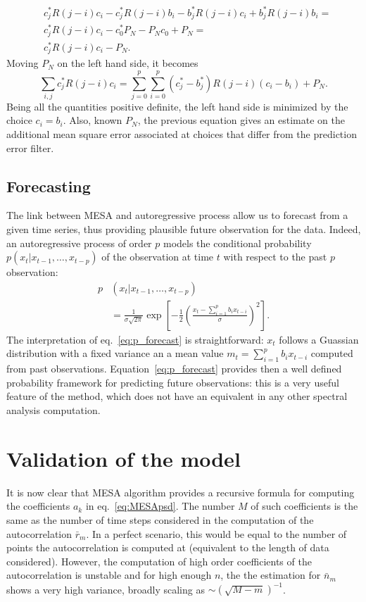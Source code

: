 \documentclass[twocolumn,showpacs,preprintnumbers,nofootinbib,prd,
superscriptaddress,10pt]{revtex4-1}
\begin{document}
\begin{align}
    & c^*_j R(j - i) c_i - c^*_j R(j - i) b_i - b^*_j R(j - i) c_i + b^*_j R(j - i)  b_i =\\ \nonumber 
    &c^*_j R(j - i) c_i - c^*_0 P_N - P_N c_0 + P_N =\\ \nonumber
    & c^*_j R(j - i) c_i - P_N.
\end{align}
Moving $P_N$ on the left hand side, it becomes 
\begin{equation}\label{eq:bestLinearPredictor}
    \sum_{i, j}c^*_j R(j-i)c_i = \sum_{j = 0}^p\sum_{i = 0}^p(c^*_j - b^*_j)R(j-i)(c_i - b_i) + P_N.
\end{equation}
Being all the quantities positive definite, the left hand side is minimized by the choice $c_i = b_i$. Also, known $P_N$, the previous equation gives an estimate on the additional mean square error associated at choices that differ from the prediction error filter. 

\subsection{Forecasting} \label{sec:forecasting}
The link between MESA and autoregressive process allow us to forecast from a given time series, thus providing plausible future observation for the data.
Indeed, an autoregressive process of order $p$ models the conditional probability $p(x_t|x_{t-1}, \ldots , x_{t-p})$ of the observation at time $t$ with respect to the past $p$ observation:
\begin{align}\label{eq:p_forecast}
	p&(x_t|x_{t-1}, \ldots , x_{t-p}) \nonumber\\
	&= \frac{1}{\sigma\sqrt{2\pi}} \exp\left[-\frac{1}{2} \left(\frac{x_t - \sum_{i = 1}^p b_i x_{t-i}}{\sigma}\right)^2\right].
\end{align}
The interpretation of eq.~\ref{eq:p_forecast} is straightforward: $x_t$ follows a Guassian distribution with a fixed variance an a mean value $m_t = \sum_{i = 1}^p b_i x_{t-i}$ computed from past observations.
Equation~\ref{eq:p_forecast} provides then a well defined probability framework for predicting future observations: this is a very useful feature of the method, which does not have an equivalent in any other spectral analysis computation.

\section{Validation of the model}
It is now clear that MESA algorithm provides a recursive formula for computing the coefficients $a_k$ in eq.~\ref{eq:MESApsd}. The number $M$ of such coefficients is the same as the number of time steps considered in the computation of the autocorrelation $\bar{r}_m$. In a perfect scenario, this would be equal to the number of points the autocorrelation is computed at (equivalent to the length of data considered). However, the computation of high order coefficients of the autocorrelation is unstable and for high enough $n$, the the estimation for  $\bar{n}_m$ shows a very high variance, broadly scaling as $\sim \left(\sqrt{M - m}\right)^{-1}$.
\end{document}
